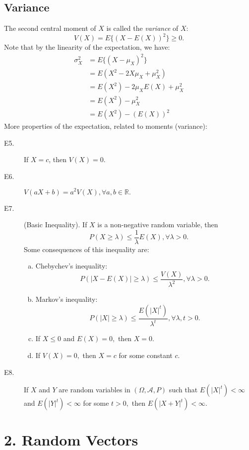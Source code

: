 \documentclass[12pt]{report} \addtolength{\textheight}{2in}
\newcommand{\Realnum}{\mathbb{R}}
\newcommand{\bigA}{\mathcal{A}}
\newcommand{\probsp}{(\Omega, \bigA, P)}
\begin{document}
\subsection*{Variance}
The second central moment of $X$ is called the \textit{variance} of $X:$
\begin{displaymath}
V(X) = E\{(X-E(X))^2\} \geq 0.
\end{displaymath}
Note that by the linearity of the expectation, we have:
\begin{align*}
\sigma_{X}^2 &= E\{(X-\mu_X)^2\}\\
&=E(X^2-2X\mu_X+\mu^2_X)\\
&=E(X^2)-2\mu_XE(X)+\mu^2_X\\
&=E(X^2)-\mu_X^2\\
&=E(X^2)-(E(X))^{2}
\end{align*}
More properties of the expectation, related to moments (variance):
\begin{description}
\item[E5.] If $X=c$, then $V(X)=0.$
\item[E6.] $V(aX+b)=a^2V(X), \forall a,b\in \Realnum.$
\item[E7.] (Basic Inequality). If $X$ is a non-negative random variable, then
\begin{displaymath}
P(X \geq \lambda) \leq \frac{1}{\lambda} E(X), \forall \lambda >0.
\end{displaymath}
Some consequences of this inequality are:
\begin{enumerate} [(a)]
\item Chebychev's inequality:
\begin{displaymath}
P(|X-E(X)| \geq \lambda) \leq \frac{V(X)}{\lambda^2}, \forall \lambda > 0.
\end{displaymath}
\item Markov's inequality:
\begin{displaymath}
P(|X| \geq \lambda) \leq \frac{E(|X|^t)}{\lambda^t}, \forall \lambda, t > 0.
\end{displaymath}
\item If $X \leq 0$ and $E(X)=0,$ then $X = 0.$
\item If $V(X)=0,$ then $X =c$ for some constant $c.$
\end{enumerate}
\item[E8.] If $X$ and $Y$ are random variables in $\probsp$ such that $E(|X|^t) < \infty$ and $E(|Y|^t) < \infty$ for some $t >0,$ then $E(|X+Y|^t)<\infty.$
\end{description}
\section*{2. Random Vectors}
\end{document}
